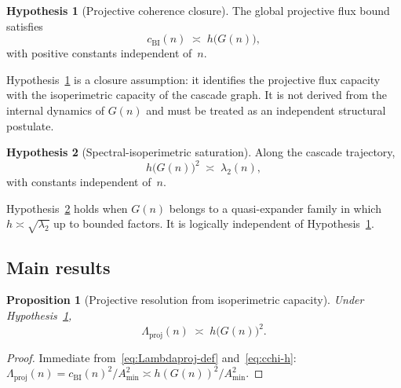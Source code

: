 \documentclass[12pt, a4paper]{article}
\theoremstyle{plain}
\newtheorem{proposition}{Proposition}[section]
\theoremstyle{definition}
\newtheorem{hypothesis}{Hypothesis}[section]
\theoremstyle{remark}
\begin{document}
      \begin{hypothesis}[Projective coherence closure]
        \label{hyp:closure}
        The global projective flux bound satisfies
        \begin{equation}
          \label{eq:cchi-h}
          c_{\mathrm{BI}}(n) \;\asymp\; h\bigl(G(n)\bigr),
        \end{equation}
        with positive constants independent of~$n$.
      \end{hypothesis}

      \noindent
      Hypothesis~\ref{hyp:closure} is a closure assumption: it identifies the
      projective flux capacity with the isoperimetric capacity of the cascade graph.
      It is not derived from the internal dynamics of $G(n)$ and must be treated as
      an independent structural postulate.

      \begin{hypothesis}[Spectral-isoperimetric saturation]
        \label{hyp:saturation}
        Along the cascade trajectory,
        \begin{equation}
          \label{eq:saturation}
          h\bigl(G(n)\bigr)^2 \;\asymp\; \lambda_2(n),
        \end{equation}
        with constants independent of~$n$.
      \end{hypothesis}

      \noindent
      Hypothesis~\ref{hyp:saturation} holds when $G(n)$ belongs to a quasi-expander
      family in which $h \asymp \sqrt{\lambda_2}$ up to bounded factors.
      It is logically independent of Hypothesis~\ref{hyp:closure}.

    \subsection{Main results}
      \label{sec:framework:results}

      \begin{proposition}[Projective resolution from isoperimetric capacity]
        \label{prop:Lambda-h}
        Under Hypothesis~\ref{hyp:closure},
        \begin{equation}
          \label{eq:Lambda-h2}
          \Lambda_{\mathrm{proj}}(n) \;\asymp\; h\bigl(G(n)\bigr)^2.
        \end{equation}
      \end{proposition}

      \begin{proof}
        Immediate from~\eqref{eq:Lambdaproj-def} and~\eqref{eq:cchi-h}:
        $\Lambda_{\mathrm{proj}}(n) = c_{\mathrm{BI}}(n)^2/A_{\min}^2
        \asymp h(G(n))^2/A_{\min}^2$.
      \end{proof}
\end{document}
